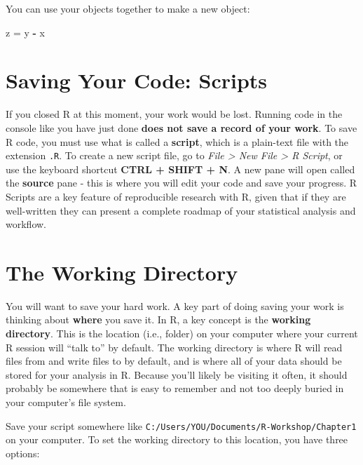 \documentclass[]{book}
\newenvironment{Shaded}{\begin{snugshade}}{\end{snugshade}}
\newcommand{\StringTok}[1]{\textcolor[rgb]{0.31,0.60,0.02}{#1}}
\newcommand{\OperatorTok}[1]{\textcolor[rgb]{0.81,0.36,0.00}{\textbf{#1}}}
\newcommand{\NormalTok}[1]{#1}
\theoremstyle{definition}
\theoremstyle{definition}
\theoremstyle{definition}
\theoremstyle{remark}
\begin{document}
You can use your objects together to make a new object:

\begin{Shaded}
\begin{Highlighting}[]
\NormalTok{z =}\StringTok{ }\NormalTok{y }\OperatorTok{-}\StringTok{ }\NormalTok{x}
\end{Highlighting}
\end{Shaded}

\section{Saving Your Code: Scripts}\label{saving-your-code-scripts}

If you closed R at this moment, your work would be lost. Running code in
the console like you have just done \textbf{does not save a record of
your work}. To save R code, you must use what is called a
\textbf{script}, which is a plain-text file with the extension
\texttt{.R}. To create a new script file, go to \emph{File
\textgreater{} New File \textgreater{} R Script}, or use the keyboard
shortcut \textbf{CTRL + SHIFT + N}. A new pane will open called the
\textbf{source} pane - this is where you will edit your code and save
your progress. R Scripts are a key feature of reproducible research with
R, given that if they are well-written they can present a complete
roadmap of your statistical analysis and workflow.

\section{The Working Directory}\label{the-working-directory}

You will want to save your hard work. A key part of doing saving your
work is thinking about \textbf{where} you save it. In R, a key concept
is the \textbf{working directory}. This is the location (i.e., folder)
on your computer where your current R session will ``talk to'' by
default. The working directory is where R will read files from and write
files to by default, and is where all of your data should be stored for
your analysis in R. Because you'll likely be visiting it often, it
should probably be somewhere that is easy to remember and not too deeply
buried in your computer's file system.

Save your script somewhere like
\texttt{C:/Users/YOU/Documents/R-Workshop/Chapter1} on your computer. To
set the working directory to this location, you have three options:
\end{document}
